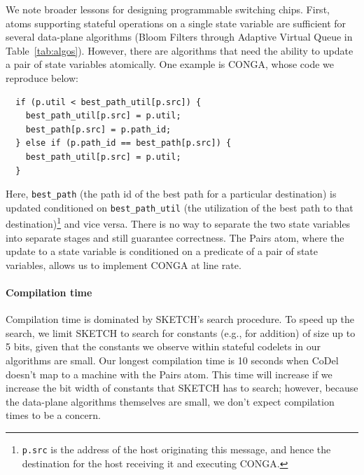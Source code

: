 We note broader lessons for designing programmable switching chips.  First,
atoms supporting stateful operations on a single state variable are sufficient
for several data-plane algorithms (Bloom Filters through Adaptive Virtual Queue
in Table~\ref{tab:algos}). However, there are algorithms that need the ability
to update a pair of state variables atomically. One example is CONGA, whose
code we reproduce below:
\begin{verbatim}
  if (p.util < best_path_util[p.src]) {
    best_path_util[p.src] = p.util;
    best_path[p.src] = p.path_id;
  } else if (p.path_id == best_path[p.src]) {
    best_path_util[p.src] = p.util;
  }
\end{verbatim}
Here, \texttt{best\_path} (the path id of the best path for a particular
destination) is updated conditioned on \texttt{best\_path\_util} (the
utilization of the best path to that destination)\footnote{{\tt p.src} is the
  address of the host originating this message, and hence the destination for
the host receiving it and executing CONGA.} and vice versa. There is no way to
separate the two state variables into separate stages and still guarantee
correctness. The Pairs atom, where the update to a state variable is conditioned
on a predicate of a pair of state variables, allows us to implement CONGA at
line rate.

\paragraph{Compilation time}
Compilation time is dominated by SKETCH's search procedure.  To speed up the
search, we limit SKETCH to search for constants (e.g., for addition) of size up
to 5 bits, given that the constants we observe within stateful codelets in our
algorithms are small. Our longest compilation time is 10 seconds when CoDel
doesn't map to a \absmachine machine with the Pairs atom.  This time will
increase if we increase the bit width of constants that SKETCH has to search;
however, because the data-plane algorithms themselves are small, we don't
expect compilation times to be a concern.


